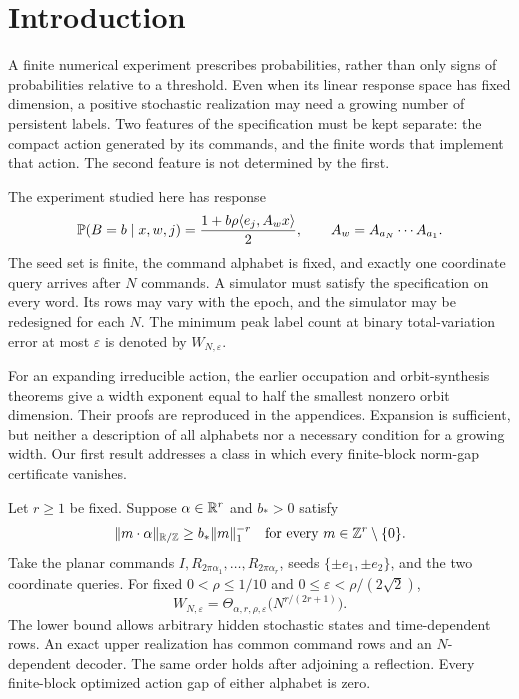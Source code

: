 \section{Introduction}
A finite numerical experiment prescribes probabilities, rather than only signs of probabilities relative to a threshold. Even when its linear response space has fixed dimension, a positive stochastic realization may need a growing number of persistent labels. Two features of the specification must be kept separate: the compact action generated by its commands, and the finite words that implement that action. The second feature is not determined by the first.

The experiment studied here has response
\begin{equation}\label{eq:law}
 \mathbb P(B=b\mid x,w,j)=\frac{1+b\rho\langle e_j,A_wx\rangle}{2},
 \qquad A_w=A_{a_N}\cdots A_{a_1}.
\end{equation}
The seed set is finite, the command alphabet is fixed, and exactly one coordinate query arrives after $N$ commands. A simulator must satisfy the specification on every word. Its rows may vary with the epoch, and the simulator may be redesigned for each $N$. The minimum peak label count at binary total-variation error at most $\varepsilon$ is denoted by $W_{N,\varepsilon}$.

For an expanding irreducible action, the earlier occupation and orbit-synthesis theorems give a width exponent equal to half the smallest nonzero orbit dimension. Their proofs are reproduced in the appendices. Expansion is sufficient, but neither a description of all alphabets nor a necessary condition for a growing width. Our first result addresses a class in which every finite-block norm-gap certificate vanishes.

\begin{theorem}\label{thm:main}
Let $r\ge1$ be fixed. Suppose $\alpha\in\mathbb R^r$ and $b_*>0$ satisfy
\begin{equation}\label{eq:dual-ba}
 \lVert m\cdot\alpha\rVert_{\mathbb R/\mathbb Z}\ge b_*\lVert m\rVert_1^{-r}
 \quad\text{for every }m\in\mathbb Z^r\setminus\{0\}.
\end{equation}
Take the planar commands $I,R_{2\pi\alpha_1},\ldots,R_{2\pi\alpha_r}$, seeds $\{\pm e_1,\pm e_2\}$, and the two coordinate queries. For fixed $0<\rho\le1/10$ and $0\le\varepsilon<\rho/(2\sqrt2)$,
\begin{equation}\label{eq:toral-order}
 W_{N,\varepsilon}=\Theta_{\alpha,r,\rho,\varepsilon}\bigl(N^{r/(2r+1)}\bigr).
\end{equation}
The lower bound allows arbitrary hidden stochastic states and time-dependent rows. An exact upper realization has common command rows and an $N$-dependent decoder. The same order holds after adjoining a reflection. Every finite-block optimized action gap of either alphabet is zero.
\end{theorem}

